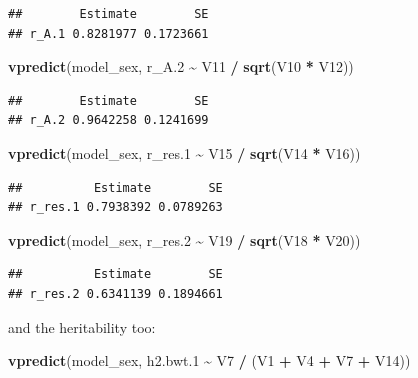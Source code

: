 \documentclass[
  12pt,
]{book}
\newenvironment{Shaded}{\begin{snugshade}}{\end{snugshade}}
\newcommand{\FloatTok}[1]{\textcolor[rgb]{0.00,0.00,0.81}{#1}}
\newcommand{\KeywordTok}[1]{\textcolor[rgb]{0.13,0.29,0.53}{\textbf{#1}}}
\newcommand{\NormalTok}[1]{#1}
\newcommand{\OperatorTok}[1]{\textcolor[rgb]{0.81,0.36,0.00}{\textbf{#1}}}
\newcommand{\StringTok}[1]{\textcolor[rgb]{0.31,0.60,0.02}{#1}}
\begin{document}
\begin{verbatim}
##        Estimate        SE
## r_A.1 0.8281977 0.1723661
\end{verbatim}

\begin{Shaded}
\begin{Highlighting}[]
\KeywordTok{vpredict}\NormalTok{(model\_sex, r\_A}\FloatTok{.2} \OperatorTok{\textasciitilde{}}\StringTok{ }\NormalTok{V11 }\OperatorTok{/}\StringTok{ }\KeywordTok{sqrt}\NormalTok{(V10 }\OperatorTok{*}\StringTok{ }\NormalTok{V12))}
\end{Highlighting}
\end{Shaded}

\begin{verbatim}
##        Estimate        SE
## r_A.2 0.9642258 0.1241699
\end{verbatim}

\begin{Shaded}
\begin{Highlighting}[]
\KeywordTok{vpredict}\NormalTok{(model\_sex, r\_res}\FloatTok{.1} \OperatorTok{\textasciitilde{}}\StringTok{ }\NormalTok{V15 }\OperatorTok{/}\StringTok{ }\KeywordTok{sqrt}\NormalTok{(V14 }\OperatorTok{*}\StringTok{ }\NormalTok{V16))}
\end{Highlighting}
\end{Shaded}

\begin{verbatim}
##          Estimate        SE
## r_res.1 0.7938392 0.0789263
\end{verbatim}

\begin{Shaded}
\begin{Highlighting}[]
\KeywordTok{vpredict}\NormalTok{(model\_sex, r\_res}\FloatTok{.2} \OperatorTok{\textasciitilde{}}\StringTok{ }\NormalTok{V19 }\OperatorTok{/}\StringTok{ }\KeywordTok{sqrt}\NormalTok{(V18 }\OperatorTok{*}\StringTok{ }\NormalTok{V20))}
\end{Highlighting}
\end{Shaded}

\begin{verbatim}
##          Estimate        SE
## r_res.2 0.6341139 0.1894661
\end{verbatim}

and the heritability too:

\begin{Shaded}
\begin{Highlighting}[]
\KeywordTok{vpredict}\NormalTok{(model\_sex, h2.bwt}\FloatTok{.1} \OperatorTok{\textasciitilde{}}\StringTok{ }\NormalTok{V7 }\OperatorTok{/}\StringTok{ }\NormalTok{(V1 }\OperatorTok{+}\StringTok{ }\NormalTok{V4 }\OperatorTok{+}\StringTok{ }\NormalTok{V7 }\OperatorTok{+}\StringTok{ }\NormalTok{V14))}
\end{Highlighting}
\end{Shaded}
\end{document}
